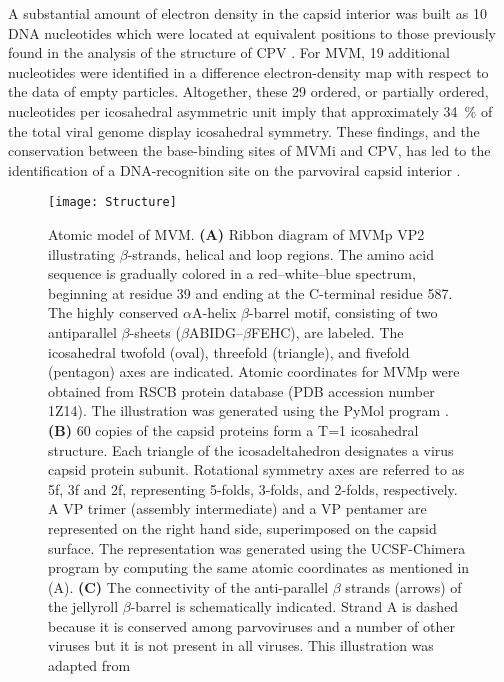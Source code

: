 A substantial amount of electron density in the capsid interior was built as 10 DNA nucleotides which were located at equivalent positions to those previously found in the analysis of the structure of CPV \cite{pmid7735832, pmid1616694}. For MVM, 19 additional nucleotides were identified in a difference electron-density map with respect to the data of empty particles. Altogether, these 29 ordered, or partially ordered, nucleotides per icosahedral asymmetric unit imply that approximately 34~\% of the total viral genome display icosahedral symmetry. These findings, and the conservation between the base-binding sites of MVMi and CPV, has led to the identification of a DNA-recognition site on the parvoviral capsid interior \cite{pmid9817841}.    

\begin{figure}
\centering
  \texttt{[image: Structure]}
  \caption[Structure of MVM]
   {Atomic model of MVM. \textbf{(A)} Ribbon diagram of MVMp VP2 illustrating $\beta$-strands, helical and loop regions. The amino acid sequence is gradually colored in a red–white–blue spectrum, beginning at residue 39 and ending at the C-terminal residue 587. The highly conserved $\alpha$A-helix $\beta$-barrel motif, consisting of two antiparallel $\beta$-sheets ($\beta$ABIDG–$\beta$FEHC), are labeled. The icosahedral twofold (oval), threefold (triangle), and fivefold (pentagon) axes are indicated. Atomic coordinates for MVMp were obtained from RSCB protein database (PDB accession number 1Z14). The illustration was generated using the PyMol program \cite{PyMol}. \textbf{(B)} 60 copies of the capsid proteins form a T=1 icosahedral structure. Each triangle of the icosadeltahedron designates a virus capsid protein subunit. Rotational symmetry axes are referred to as 5f, 3f and 2f, representing 5-folds, 3-folds, and 2-folds, respectively. A VP trimer (assembly intermediate) and a VP pentamer are represented on the right hand side, superimposed on the capsid surface. The representation was generated using the UCSF-Chimera program \cite{pmid15264254} by computing the same atomic coordinates as mentioned in (A). \textbf{(C)} The connectivity of the anti-parallel $\beta$ strands (arrows) of the jellyroll $\beta$-barrel is schematically indicated. Strand A is dashed because it is conserved among parvoviruses and a number of other viruses but it is not present in all viruses. This illustration was adapted from \cite{Structure}} 
\label{Structure1}
\end{figure}


